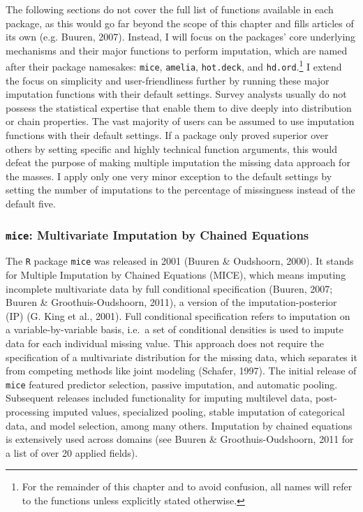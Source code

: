 \documentclass[12pt,econ]{sources/authesis}
\begin{document}
The following sections do not cover the full list of functions available in each package, as this would go far beyond the scope of this chapter and fills articles of its own (e.g. Buuren, 2007). Instead, I will focus on the packages' core underlying mechanisms and their major functions to perform imputation, which are named after their package namesakes: \texttt{mice}, \texttt{amelia}, \texttt{hot.deck}, and \texttt{hd.ord}.\footnote{For the remainder of this chapter and to avoid confusion, all names will refer to the functions unless explicitly stated otherwise.} I extend the focus on simplicity and user-friendliness further by running these major imputation functions with their default settings. Survey analysts usually do not possess the statistical expertise that enable them to dive deeply into distribution or chain properties. The vast majority of users can be assumed to use imputation functions with their default settings. If a package only proved superior over others by setting specific and highly technical function arguments, this would defeat the purpose of making multiple imputation the missing data approach for the masses. I apply only one very minor exception to the default settings by setting the number of imputations to the percentage of missingness instead of the default five.

\hypertarget{ordmiss-theory-multimpute-mice}{%
\subsubsection{\texorpdfstring{\texttt{mice}: Multivariate Imputation by Chained Equations}{mice: Multivariate Imputation by Chained Equations}}\label{ordmiss-theory-multimpute-mice}}

The \texttt{R} package \texttt{mice} was released in 2001 (Buuren \& Oudshoorn, 2000). It stands for Multiple Imputation by Chained Equations (MICE), which means imputing incomplete multivariate data by full conditional specification (Buuren, 2007; Buuren \& Groothuis-Oudshoorn, 2011), a version of the imputation-posterior (IP) (G. King et al., 2001). Full conditional specification refers to imputation on a variable-by-variable basis, i.e.~a set of conditional densities is used to impute data for each individual missing value. This approach does not require the specification of a multivariate distribution for the missing data, which separates it from competing methods like joint modeling (Schafer, 1997). The initial release of \texttt{mice} featured predictor selection, passive imputation, and automatic pooling. Subsequent releases included functionality for imputing multilevel data, post-processing imputed values, specialized pooling, stable imputation of categorical data, and model selection, among many others. Imputation by chained equations is extensively used across domains (see Buuren \& Groothuis-Oudshoorn, 2011 for a list of over 20 applied fields).
\end{document}

